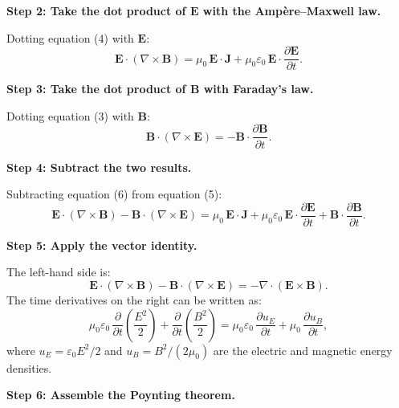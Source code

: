 \textbf{Step 2: Take the dot product of $\mathbf{E}$ with the Amp\`ere--Maxwell law.}

Dotting equation (4) with $\mathbf{E}$:
\begin{equation}
\mathbf{E}\cdot(\nabla\times\mathbf{B}) = \mu_0\,\mathbf{E}\cdot\mathbf{J} + \mu_0\varepsilon_0\,\mathbf{E}\cdot\frac{\partial\mathbf{E}}{\partial t}.
\end{equation}

\textbf{Step 3: Take the dot product of $\mathbf{B}$ with Faraday's law.}

Dotting equation (3) with $\mathbf{B}$:
\begin{equation}
\mathbf{B}\cdot(\nabla\times\mathbf{E}) = -\mathbf{B}\cdot\frac{\partial\mathbf{B}}{\partial t}.
\end{equation}

\textbf{Step 4: Subtract the two results.}

Subtracting equation (6) from equation (5):
\begin{equation}
\mathbf{E}\cdot(\nabla\times\mathbf{B}) - \mathbf{B}\cdot(\nabla\times\mathbf{E}) = \mu_0\,\mathbf{E}\cdot\mathbf{J} + \mu_0\varepsilon_0\,\mathbf{E}\cdot\frac{\partial\mathbf{E}}{\partial t} + \mathbf{B}\cdot\frac{\partial\mathbf{B}}{\partial t}.
\end{equation}

\textbf{Step 5: Apply the vector identity.}

The left-hand side is:
\begin{equation}
\mathbf{E}\cdot(\nabla\times\mathbf{B}) - \mathbf{B}\cdot(\nabla\times\mathbf{E}) = -\nabla\cdot(\mathbf{E}\times\mathbf{B}).
\end{equation}
The time derivatives on the right can be written as:
\begin{equation}
\mu_0\varepsilon_0\,\frac{\partial}{\partial t}\!\left(\frac{E^{2}}{2}\right) + \frac{\partial}{\partial t}\!\left(\frac{B^{2}}{2}\right) = \mu_0\varepsilon_0\,\frac{\partial u_E}{\partial t} + \mu_0\,\frac{\partial u_B}{\partial t},
\end{equation}
where $u_E = \varepsilon_0 E^{2}/2$ and $u_B = B^{2}/(2\mu_0)$ are the electric and magnetic energy densities.

\textbf{Step 6: Assemble the Poynting theorem.}

